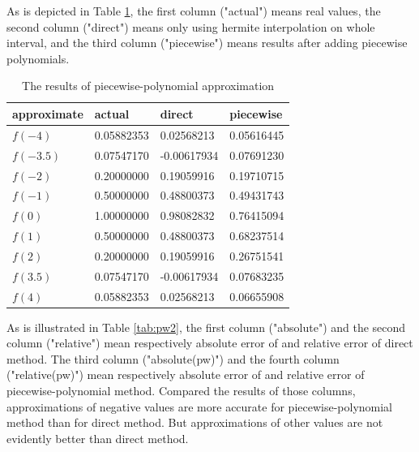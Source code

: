 \documentclass[preprint,12pt]{elsarticle}
\begin{document}
As is depicted in Table \ref{tab:pw1}, the first column ("actual") means real values, the second column ("direct") means only using hermite interpolation on whole interval, and the third column ("piecewise") means results after adding piecewise polynomials.

\begin{table}[ht]
\centering
\begin{tabular}{l|l l l}
\textbf{approximate} & \textbf{actual} & \textbf{direct} & \textbf{piecewise}\\
\hline
$f(-4)$ & 0.05882353 & 0.02568213 & 0.05616445 \\
$f(-3.5)$ & 0.07547170 & -0.00617934 & 0.07691230 \\
$f(-2)$ & 0.20000000 & 0.19059916 & 0.19710715 \\
$f(-1)$ & 0.50000000 & 0.48800373 & 0.49431743 \\
$f(0)$ & 1.00000000 & 0.98082832 & 0.76415094 \\
$f(1)$ & 0.50000000 & 0.48800373 & 0.68237514 \\
$f(2)$ & 0.20000000 & 0.19059916 & 0.26751541 \\
$f(3.5)$ & 0.07547170 & -0.00617934 & 0.07683235 \\
$f(4)$ & 0.05882353 & 0.02568213 & 0.06655908
\end{tabular}
\caption{The results of piecewise-polynomial approximation}
\label{tab:pw1}
\end{table}

As is illustrated in Table \ref{tab:pw2}, the first column ("absolute") and the second column ("relative") mean respectively absolute error of and relative error of direct method. The third column ("absolute(pw)") and the fourth column ("relative(pw)") mean respectively absolute error of and relative error of piecewise-polynomial method. Compared the results of those columns, approximations of negative values are more accurate for piecewise-polynomial method than for direct method. But approximations of other values are not evidently better than direct method.
\end{document}
